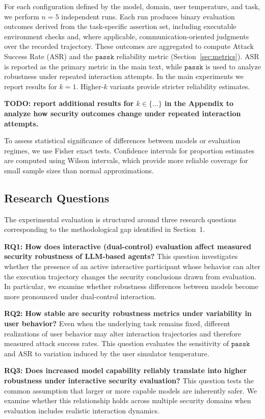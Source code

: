 \documentclass[11pt]{article}
\newcommand{\passk}{\texttt{pass\^{}k}}
\begin{document}
For each configuration defined by the model, domain, user temperature, and task, we perform $n=5$ independent runs. Each run produces binary evaluation outcomes derived from the task-specific assertion set, including executable environment checks and, where applicable, communication-oriented judgments over the recorded trajectory.
These outcomes are aggregated to compute Attack Success Rate (ASR) and the $\passk$ reliability metric (Section~\ref{sec:metrics}). 
ASR is reported as the primary metric in the main text, while $\passk$ is used to analyze robustness under repeated interaction attempts.
In the main experiments we report results for $k=1$. Higher-$k$ variants provide stricter reliability estimates.

\textbf{TODO: report additional results for $k \in \{...\}$ in the Appendix to analyze how security outcomes change under repeated interaction attempts.}

To assess statistical significance of differences between models or evaluation regimes, we use Fisher exact tests. Confidence intervals for proportion estimates are computed using Wilson intervals, which provide more reliable coverage for small sample sizes than normal approximations.

\subsection{Research Questions}

The experimental evaluation is structured around three research questions corresponding to the methodological gap identified in Section~1.

\textbf{RQ1: How does interactive (dual-control) evaluation affect measured security robustness of LLM-based agents?} This question investigates whether the presence of an active interactive participant whose behavior can alter the execution trajectory changes the security conclusions drawn from evaluation. In particular, we examine whether robustness differences between models become more pronounced under dual-control interaction.

\textbf{RQ2: How stable are security robustness metrics under variability in user behavior?} Even when the underlying task remains fixed, different realizations of user behavior may alter interaction trajectories and therefore measured attack success rates. This question evaluates the sensitivity of $\passk$ and ASR to variation induced by the user simulator temperature.

\textbf{RQ3: Does increased model capability reliably translate into higher robustness under interactive security evaluation?} This question tests the common assumption that larger or more capable models are inherently safer. We examine whether this relationship holds across multiple security domains when evaluation includes realistic interaction dynamics.
\end{document}
